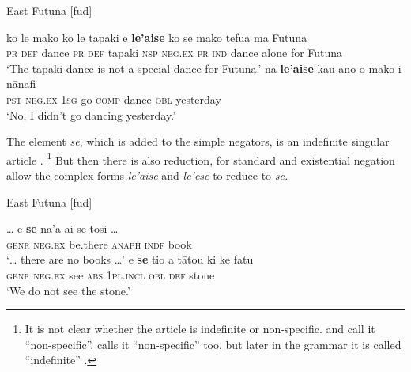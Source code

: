﻿\documentclass[output=paper,draft,draftmode,colorlinks,citecolor=brown]{langscibook}
\begin{document}
\begin{exe}\ex\label{ex:int-futuna-dance}
 East Futuna [fud]   
    \begin{xlist}
    \ex\label{ex:int-futuna-dance-special}
    \gll ko  le  mako    ko  le  tapaki  e  \textbf{le'aise}  ko   se
    mako  tefua  ma  Futuna\\
    \textsc{pr}  \textsc{def}  dance    \textsc{pr}  \textsc{def}   tapaki
    \textsc{nsp}  \textsc{neg.ex}  \textsc{pr}    \textsc{ind} dance
    alone     for      Futuna \\
    \glt `The tapaki dance is not a special dance for Futuna.' 
    \ex\label{ex:int-futuna-dance-yesterday}
    \gll  na  \textbf{le'aise}  kau  ano  o  mako  i  nānafi\\
    \textsc{pst}  \textsc{neg.ex}  \textsc{1sg}  go  \textsc{comp}  dance
    \textsc{obl}  yesterday\\
    \glt `No, I didn't go dancing yesterday.'\footnotemark%
    \end{xlist}\end{exe}
%
The element \textit{se}, which is added to the simple negators, is an
indefinite singular article \parencite[122]{MoyseFaurie1999}.%
%
    \footnote{It is not clear whether the article is indefinite or
    non-specific.  \textcite[18]{Mosel1999} and
    \textcite[1363]{Veselinova2014} call it ``non-specific''.
    \textcite[45]{MoyseFaurie1997} calls it ``non-specific'' too, but later
    in the grammar it is called ``indefinite''
    \parencite[88]{MoyseFaurie1997}.} %
%
But then there is also reduction, for
standard and existential negation allow the complex forms \textit{le'aise}
and \textit{le'ese} to reduce to \textit{se.} 
%
\begin{exe}\ex\label{ex:int-futuna-books-stone}
 East Futuna [fud] 
    \begin{xlist}
    \ex\label{ex:int-futuna-books}
    \gll \ldots{} e \textbf{se} na'a ai se tosi \ldots{} \\
{} \textsc{genr} \textsc{neg.ex} be.there \textsc{anaph} \textsc{indf}
book\\
    \glt `\ldots{} there are no books \ldots{}' 
    \ex\label{ex:int-futuna-stone}
    \gll e  \textbf{se}  tio  a  tātou  ki  ke  fatu\\
    \textsc{genr}  \textsc{neg.ex}  see  \textsc{abs}  \textsc{1pl.incl}
    \textsc{obl}  \textsc{def}  stone\\
    \glt `We do not see the stone.'
    \end{xlist}\end{exe}
\end{document}
